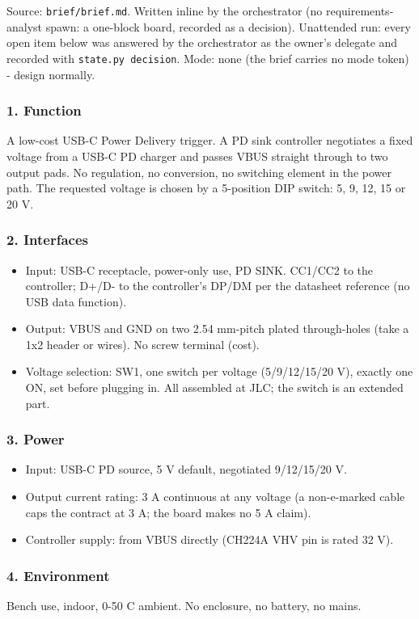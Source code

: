 \documentclass[11pt,a4paper]{article}
\begin{document}
Source: \texttt{brief/brief.md}. Written inline by the orchestrator (no requirements-analyst spawn: a one-block board, recorded as a decision). Unattended run: every open item below was answered by the orchestrator as the owner's delegate and recorded with \texttt{state.py decision}. Mode: none (the brief carries no mode token) - design normally.

\subsubsection*{1. Function}
A low-cost USB-C Power Delivery trigger. A PD sink controller negotiates a fixed voltage from a USB-C PD charger and passes VBUS straight through to two output pads. No regulation, no conversion, no switching element in the power path. The requested voltage is chosen by a 5-position DIP switch: 5, 9, 12, 15 or 20 V.

\subsubsection*{2. Interfaces}
\begin{itemize}
\item Input: USB-C receptacle, power-only use, PD SINK. CC1/CC2 to the controller; D+/D- to
the controller's DP/DM per the datasheet reference (no USB data function).
\item Output: VBUS and GND on two 2.54 mm-pitch plated through-holes (take a 1x2 header or
wires). No screw terminal (cost).
\item Voltage selection: SW1, one switch per voltage (5/9/12/15/20 V), exactly one ON, set
before plugging in. All assembled at JLC; the switch is an extended part.
\end{itemize}
\subsubsection*{3. Power}
\begin{itemize}
\item Input: USB-C PD source, 5 V default, negotiated 9/12/15/20 V.
\item Output current rating: 3 A continuous at any voltage (a non-e-marked cable caps the
contract at 3 A; the board makes no 5 A claim).
\item Controller supply: from VBUS directly (CH224A VHV pin is rated 32 V).
\end{itemize}
\subsubsection*{4. Environment}
Bench use, indoor, 0-50 C ambient. No enclosure, no battery, no mains.
\end{document}
